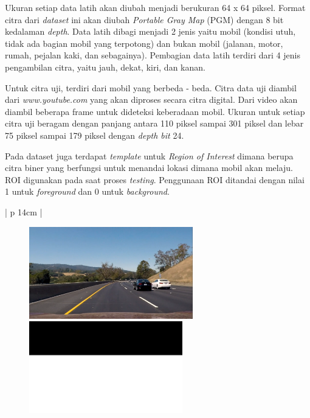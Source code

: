 Ukuran setiap data latih akan diubah menjadi berukuran 64 x 64 piksel. Format citra dari \textit{dataset} ini akan diubah \textit{Portable Gray Map} (PGM) dengan 8 bit kedalaman \textit{depth}. Data latih dibagi menjadi 2 jenis yaitu mobil (kondisi utuh, tidak ada bagian mobil yang terpotong) dan bukan mobil (jalanan, motor, rumah, pejalan kaki, dan sebagainya). Pembagian data latih terdiri dari 4 jenis pengambilan citra, yaitu jauh, dekat, kiri, dan kanan.

Untuk citra uji, terdiri dari mobil yang berbeda - beda. Citra data uji diambil dari \textit{www.youtube.com} yang akan diproses secara citra digital. Dari video akan diambil beberapa frame untuk dideteksi keberadaan mobil. Ukuran untuk setiap citra uji beragam dengan panjang antara 110 piksel sampai 301 piksel dan lebar 75 piksel sampai 179 piksel dengan \textit{depth bit} 24.

Pada dataset juga terdapat \textit{template} untuk \textit{Region of Interest} dimana berupa citra biner yang berfungsi untuk menandai lokasi dimana mobil akan melaju. ROI digunakan pada saat proses \textit{testing}. Penggunaan ROI ditandai dengan nilai 1 untuk \textit{foreground} dan 0 untuk \textit{background}.

\begin{table}[H]
	\small
	\begin{adjustbox}{width=1\textwidth}
		\begin{tabular}{| p {14cm} |}
			\hline
			\begin{figure}[H]
				\centering
				{\includegraphics[height = 4cm]{images/ROI}} 
				{\includegraphics[height = 4cm]{images/ROI_biner}}\\
			\end{figure} \\
			\hline
		\end{tabular}
	\end{adjustbox}
	\label{fig:ContohROI}
\end{table}

